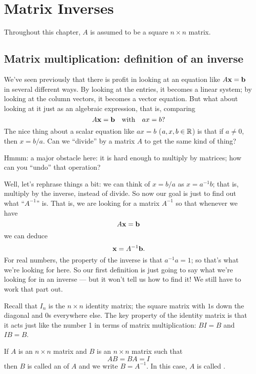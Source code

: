 \chapter{Matrix Inverses}
\label{chapter:18inverses}
 

Throughout this chapter, $A$ is assumed to be a square
$n \times n$ matrix.


\section{Matrix multiplication: definition of an inverse}

 

 
We've seen previously that there is profit in looking at 
an equation like $A\mathbf{x}=\mathbf{b}$ in several different
ways.  By looking at the entries, it becomes a linear
system; by looking at the column vectors, it becomes a
vector equation.  But what about looking at it just
as an algebraic expression, that is, comparing
$$
A\mathbf{x} = \mathbf{b} \quad \textrm{with}\quad ax=b ?
$$
The nice thing about a scalar equation like $ax=b$ ($a,x,b\in \mathbb{R}$)
is that if $a\neq 0$, then $x = b/a$.  Can we ``divide'' by
a matrix $A$ to get the same kind of thing?

Hmmm: a major obstacle here:  it is hard enough to multiply by
matrices; how can you ``undo'' that operation? 

Well, let's rephrase things a bit:  we can think of $x = b/a$ as $x = a^{-1}b$;
that is, multiply by the inverse, instead of divide.  So now our goal
is just to find out what ``$A^{-1}$'' is.  That is, we are looking
for a matrix $A^{-1}$ so that whenever we have
$$
A\mathbf{x} = \mathbf{b}
$$
we can deduce
$$
\mathbf{x} = A^{-1}\mathbf{b}.
$$
For real numbers, the property of the inverse is that $a^{-1} a=1$; so
that's what we're looking for here.  So our first definition is
just going to say what we're looking for in an inverse --- but it
won't tell us how to find it!  We still have to work that part out.


Recall that $I_n$ is the $n\times n$ identity matrix; the square matrix
with $1$s down the diagonal and $0$s everywhere else.  The key property
of the identity matrix is that it acts just like the number 1 in terms
of matrix multiplication:  $BI = B$ and $IB = B$.

\begin{definition}
If $A$ is an $n \times n$ matrix and $B$ is an $n \times n$ matrix such that
$$
AB = BA = I
$$
then $B$ is called an  of $A$ and we write $B = A^{-1}$.  In this
case, $A$ is called .
\end{definition}

